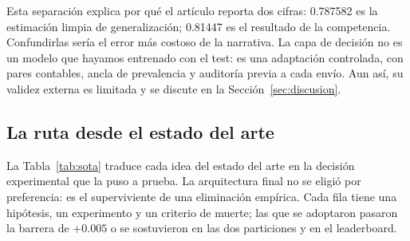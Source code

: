 Esta separación explica por qué el artículo reporta dos cifras: 0.787582 es la
estimación limpia de generalización; 0.81447 es el resultado de la competencia.
Confundirlas sería el error más costoso de la narrativa. La capa de decisión no
es un modelo que hayamos entrenado con el test: es una adaptación controlada,
con pares contables, ancla de prevalencia y auditoría previa a cada envío. Aun
así, su validez externa es limitada y se discute en la
Sección~\ref{sec:discusion}.

\subsection{La ruta desde el estado del arte}

La Tabla~\ref{tab:sota} traduce cada idea del estado del arte en la decisión
experimental que la puso a prueba. La arquitectura final no se eligió por
preferencia: es el superviviente de una eliminación empírica. Cada fila tiene
una hipótesis, un experimento y un criterio de muerte; las que se adoptaron
pasaron la barrera de $+0.005$ o se sostuvieron en las dos particiones y en el
leaderboard.

